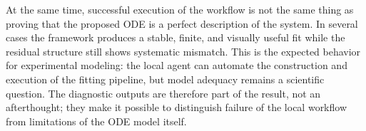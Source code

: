 At the same time, successful execution of the workflow is not the same thing
as proving that the proposed ODE is a perfect description of the system.  In
several cases the framework produces a stable, finite, and visually useful fit
while the residual structure still shows systematic mismatch.  This is the
expected behavior for experimental modeling: the local agent can automate the
construction and execution of the fitting pipeline, but model adequacy remains
a scientific question.  The diagnostic outputs are therefore part of the
result, not an afterthought; they make it possible to distinguish failure of
the local workflow from limitations of the ODE model itself.
